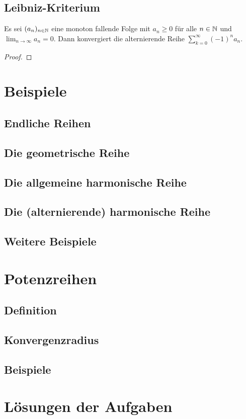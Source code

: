 \documentclass[a4paper,10pt]{article}
\begin{document}
\subsection{Leibniz-Kriterium}


\begin{prop}
 Es sei $(a_n)_{n \in \mathbb{N}}$ eine monoton fallende Folge mit $a_n \geq 0$ für alle $n \in \mathbb{N}$ und $\lim_{n \to \infty} a_n = 0$. Dann konvergiert die alternierende Reihe $\sum_{k=0}^\infty (-1)^n a_n$.
\end{prop}
\begin{proof}
 
\end{proof}



\section{Beispiele}



\subsection{Endliche Reihen}


\subsection{Die geometrische Reihe}


\subsection{Die allgemeine harmonische Reihe}


\subsection{Die (alternierende) harmonische Reihe}


\subsection{Weitere Beispiele}





\section{Potenzreihen}


\subsection{Definition}


\subsection{Konvergenzradius}


\subsection{Beispiele}





\newpage





\section{Lösungen der Aufgaben}

\printsolutions
\end{document}

